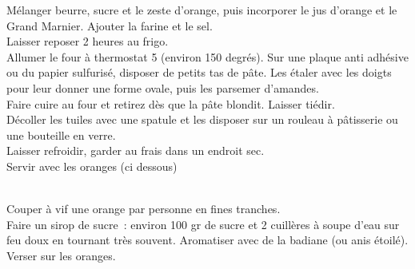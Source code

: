 \begin{minipage}[c]{\textwidth}
Mélanger beurre, sucre et le zeste d’orange, puis incorporer le jus d’orange et le Grand Marnier. Ajouter la farine et le sel. \\
Laisser reposer 2 heures au frigo. \\
Allumer le four à thermostat 5 (environ 150 degrés). Sur une plaque anti adhésive ou du papier sulfurisé, disposer de petits tas de pâte. Les étaler avec les doigts pour leur donner une forme ovale, puis les parsemer d’amandes. \\
Faire cuire au four et retirez dès que la pâte blondit. Laisser tiédir. \\
Décoller les tuiles avec une spatule et les disposer sur un rouleau à pâtisserie ou une bouteille en verre. \\
Laisser refroidir, garder au frais dans un endroit sec. \\
Servir avec les oranges (ci dessous)\\
\\

\end{minipage}

\begin{minipage}[c]{\textwidth}
Couper à vif une orange par personne en fines tranches. \\
Faire un sirop de sucre : environ 100 gr de sucre et 2 cuillères à soupe d’eau sur feu doux en tournant très souvent. Aromatiser avec de la badiane (ou anis étoilé). \\
Verser sur les oranges.\\
\\

\end{minipage}

